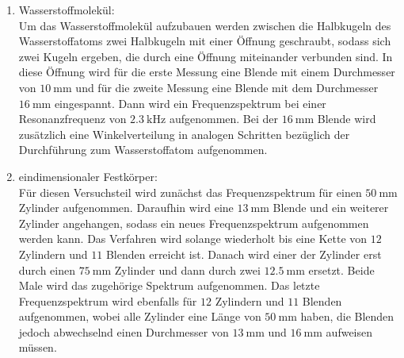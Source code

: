 \begin{enumerate}
        \newpage
    \item Wasserstoffmolekül:\\
        Um das Wasserstoffmolekül aufzubauen werden zwischen die Halbkugeln des 
        Wasserstoffatoms zwei Halbkugeln mit einer Öffnung geschraubt, sodass sich 
        zwei Kugeln ergeben, die durch eine Öffnung miteinander verbunden sind.
        In diese Öffnung wird für die erste Messung eine Blende mit einem 
        Durchmesser von $\SI{10}{\milli\meter}$ und für die zweite Messung eine 
        Blende mit dem Durchmesser $\SI{16}{\milli\meter}$ eingespannt.
        Dann wird ein Frequenzspektrum bei einer Resonanzfrequenz von 
        $\SI{2,3}{\kilo\hertz}$ aufgenommen. 
        Bei der $\SI{16}{\milli\meter}$ Blende wird zusätzlich eine
        Winkelverteilung in analogen Schritten bezüglich der Durchführung
        zum Wasserstoffatom aufgenommen.
    \item eindimensionaler Festkörper:\\
        Für diesen Versuchsteil wird zunächst das Frequenzspektrum für einen 
        $\SI{50}{\milli\meter}$ Zylinder aufgenommen. Daraufhin wird eine 
        $\SI{13}{\milli\meter}$ Blende und ein weiterer Zylinder angehangen, sodass 
        ein neues Frequenzspektrum aufgenommen werden kann. Das Verfahren wird 
        solange wiederholt bis eine Kette von $\num{12}$ Zylindern und $\num{11}$
        Blenden erreicht ist. Danach wird einer der Zylinder erst durch einen 
        $\SI{75}{\milli\meter}$ Zylinder und dann durch zwei $\SI{12,5}{\milli\meter}$
        ersetzt. Beide Male wird das zugehörige Spektrum aufgenommen.
        Das letzte Frequenzspektrum wird ebenfalls für $\num{12}$ Zylindern und $\num{11}$
        Blenden aufgenommen, wobei alle Zylinder eine Länge von $\SI{50}{\milli\meter}$
        haben, die Blenden jedoch abwechselnd einen Durchmesser von
        $\SI{13}{\milli\meter}$ und $\SI{16}{\milli\meter}$ aufweisen müssen.
\end{enumerate}

\cite{sample}
\newpage